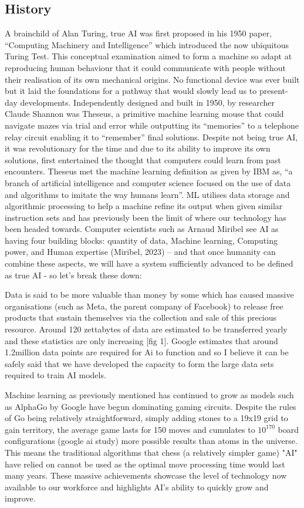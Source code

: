 \subsection{History}
A brainchild of Alan Turing, true AI was first proposed in his 1950 paper, “Computing Machinery and Intelligence” which introduced the now ubiquitous Turing Test. This conceptual examination aimed to form a machine so adapt at reproducing human behaviour that it could communicate with people without their realisation of its own mechanical origins. No functional device was ever built but it laid the foundations for a pathway that would slowly lead us to present-day developments. Independently designed and built in 1950, by researcher Claude Shannon was Theseus, a primitive machine learning mouse that could navigate mazes via trial and error while outputting its “memories” to a telephone relay circuit enabling it to “remember” final solutions. Despite not being true AI, it was revolutionary for the time and due to its ability to improve its own solutions, first entertained the thought that computers could learn from past encounters. Theseus met the machine learning definition as given by IBM as, “a branch of artificial intelligence and computer science focused on the use of data and algorithms to imitate the way humans learn”. ML utilises data storage and algorithmic processing to help a machine refine its output when given similar instruction sets and has previously been the limit of where our technology has been headed towards. Computer scientists such as Arnaud Miribel see AI as having four building blocks: quantity of data, Machine learning, Computing power, and Human expertise (Miribel, 2023) – and that once humanity can combine these aspects, we will have a system sufficiently advanced to be defined as true AI - so let’s break these down:

Data is said to be more valuable than money by some which has caused massive organisations (such as Meta, the parent company of Facebook) to release free products that sustain themselves via the collection and sale of this precious resource. Around 120 zettabytes of data are estimated to be transferred yearly and these statistics are only increasing [fig 1]. Google estimates that around 1.2million data points are required for Ai to function and so I believe it can be safely said that we have developed the capacity to form the large data sets required to train AI models.

Machine learning as previously mentioned has continued to grow as models such as AlphaGo by Google have begun dominating gaming circuits. Despite the rules of Go being relatively straightforward, simply adding stones to a 19x19 grid to gain territory, the average game lasts for 150 moves and cumulates to $10^{170}$ board configurations (google ai study)  more possible results than atoms in the universe. This means the traditional algorithms that chess (a relatively simpler game) "AI" have relied on cannot be used as the optimal move processing time would last many years. These massive achievements showcase the level of technology now available to our workforce and highlights AI's ability to quickly grow and improve.


